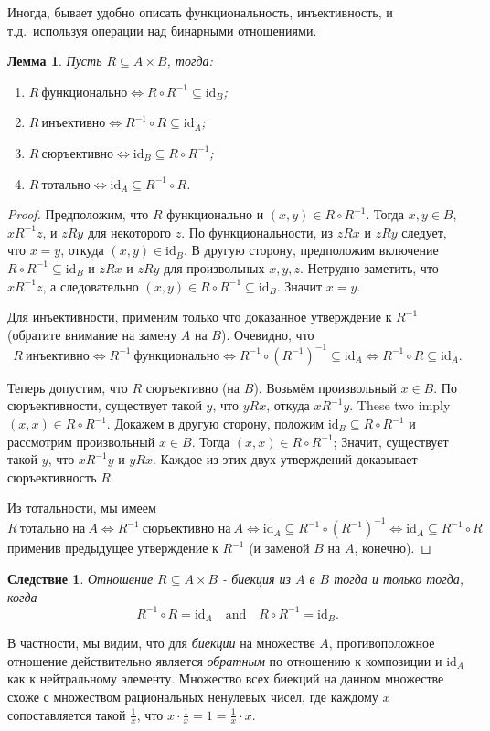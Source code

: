 \documentclass[12pt,notitlepage]{article}
\theoremstyle{plain}
\newtheorem{lemma}[thm]{Лемма}
\newtheorem{corr}[thm]{Следствие}
\theoremstyle{definition}
\theoremstyle{plain}
\newcommand{\sbs}{\subseteq}
\newcommand{\id}{\mathrm{id}}
\newcommand{\1}{\mathbf{1}}
\newcommand{\0}{\mathbf{0}}
\begin{document}
Иногда, бывает удобно описать функциональность, инъективность, и т.д.\ используя операции над бинарными отношениями.
\begin{lemma}\label{rel:fnc_algebra}
	Пусть $R \sbs A \times B$, тогда:
	\begin{enumerate}
		\item $R\ \mbox{функционально} \iff R \circ R^{-1} \sbs \id_B$;
		\item $R\ \mbox{инъективно} \iff R^{-1} \circ R \sbs \id_A$;
		\item $R\ \mbox{сюръективно} \iff \id_B \sbs R \circ R^{-1}$;
		\item $R\ \mbox{тотально} \iff \id_A \sbs R^{-1} \circ R$.
	\end{enumerate}
\end{lemma}
\begin{proof}
	Предположим, что $R$ функционально и $(x, y) \in R \circ R^{-1}$. Тогда $x, y \in B$, $x R^{-1} z$, и $z R y$ для некоторого $z$. По функциональности, из $z R x$ и $z R y$ следует, что $x = y$, откуда $(x, y) \in \id_B$. В другую сторону, предположим включение $R \circ R^{-1} \sbs \id_B$ и $z R x$ и $z R y$ для произвольных $x, y, z$. Нетрудно заметить, что $x R^{-1} z$, а следовательно $(x, y) \in R \circ R^{-1} \sbs \id_B$. Значит $x = y$.
	
	Для инъективности, применим только что доказанное утверждение к $R^{-1}$ (обратите внимание на замену $A$ на $B$). Очевидно, что
	$$R\ \mbox{инъективно} \iff R^{-1}\ \mbox{функционально} \iff R^{-1} \circ (R^{-1})^{-1} \sbs \id_A \iff R^{-1} \circ R \sbs \id_A.$$
	
	Теперь допустим, что $R$ сюръективно (на $B$). Возьмём произвольный $x \in B$. По сюръективности, существует такой $y$, что $y R x$, откуда $x R^{-1} y$. These two imply $(x, x) \in R  \circ R^{-1}$. Докажем в другую сторону, положим $\id_B \sbs R \circ R^{-1}$ и рассмотрим произвольный $x \in B$. Тогда $(x, x) \in R \circ R^{-1}$; Значит, существует такой $y$, что $x R^{-1} y$ и $y R x$. Каждое из этих двух утверждений доказывает сюръективность $R$.
	
	Из тотальности, мы имеем
	$$R\ \mbox{тотально на}\ A \iff R^{-1}\ \mbox{сюръективно на}\ A \iff \id_A \sbs R^{-1} \circ (R^{-1})^{-1} \iff \id_A \sbs R^{-1} \circ R$$
	применив предыдущее утверждение к $R^{-1}$ (и заменой $B$ на $A$, конечно).
\end{proof}

\begin{corr}\label{ch0:bi_cmp}
	Отношение $R \sbs A \times B$ - биекция из $A$ в $B$ тогда и только тогда, когда
	$$R^{-1}\circ R = \id_A\quad \mbox{and}\quad R \circ R^{-1} = \id_B.$$
\end{corr}
В частности, мы видим, что для \emph{биекции} на множестве $A$, противоположное отношение действительно является \emph{обратным} по отношению к композиции и $\id_A$ как к нейтральному элементу. Множество всех биекций на данном множестве схоже с множеством рациональных ненулевых чисел, где каждому $x$ сопоставляется такой $\frac{1}{x}$, что $x \cdot \frac{1}{x} = 1 = \frac{1}{x} \cdot x$.
\end{document}
